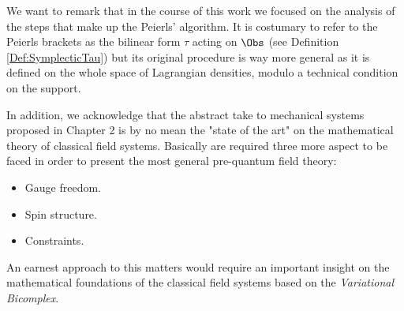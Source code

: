 \documentclass[Main]{subfiles}
\begin{document}
		\vspace{2mm}
		
		We want to remark that in the course of this work we focused on the analysis of the steps that make up the Peierls' algorithm.
		It is costumary to refer to the Peierls brackets as the bilinear form $\tau$ acting on $\Obs$ (see Definition \ref{Def:SymplecticTau}) but its original procedure is way more general as it is defined on the whole space of Lagrangian densities, modulo a technical condition on the support.
		
		In addition, we acknowledge that the abstract take to mechanical systems proposed in Chapter 2 is by no mean the "state of the art"  on the mathematical theory of classical field systems.
		Basically are required three more aspect to be faced in order to present the most general pre-quantum field theory:
		\begin{itemize}
			\item Gauge freedom.
			\item Spin structure.
			\item Constraints.
		\end{itemize}
		An earnest approach to this matters would require an important insight on the mathematical foundations of the classical field systems based on the \emph{Variational Bicomplex}.\cite{G.Sardanashvily2013,Giachetta2009,Khavkine2014}
\end{document}

